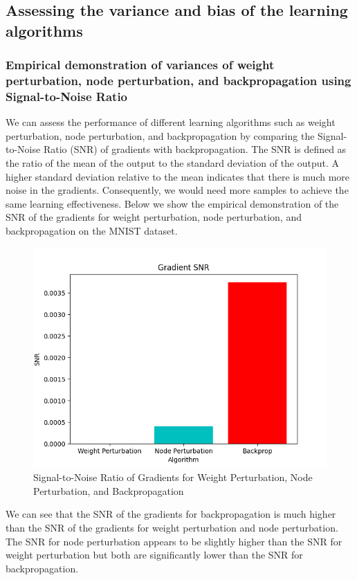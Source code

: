 \documentclass[12pt, letterpaper]{article}
\begin{document}
\subsection{Assessing the variance and bias of the learning algorithms}

\subsubsection{Empirical demonstration of variances of weight perturbation, node perturbation, and backpropagation using Signal-to-Noise Ratio}
We can assess the performance of different learning algorithms such as weight perturbation, node perturbation, and backpropagation by comparing the Signal-to-Noise Ratio (SNR) of gradients with backpropagation. The SNR is defined as the ratio of the mean of the output to the standard deviation of the output. A higher standard deviation relative to the mean indicates that there is much more noise in the gradients. Consequently, we would need more samples to achieve the same learning effectiveness. Below we show the empirical demonstration of the SNR of the gradients for weight perturbation, node perturbation, and backpropagation on the MNIST dataset.

\begin{figure}[H]
    \centering
    \includegraphics[width=.7\textwidth]{gradient_snr.png}
    \caption{Signal-to-Noise Ratio of Gradients for Weight Perturbation, Node Perturbation, and Backpropagation}
    \label{fig:gradient_snr}
\end{figure}

We can see that the SNR of the gradients for backpropagation is much higher than the SNR of the gradients for weight perturbation and node perturbation. The SNR for node perturbation appears to be slightly higher than the SNR for weight perturbation but both are significantly lower than the SNR for backpropagation.
\end{document}
